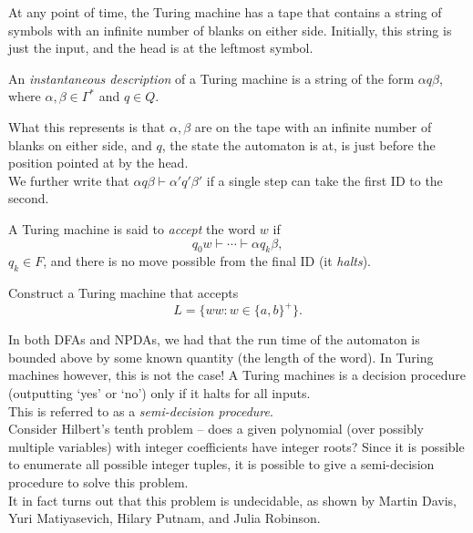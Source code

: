 	At any point of time, the Turing machine has a tape that contains a string of symbols with an infinite number of blanks on either side. Initially, this string is just the input, and the head is at the leftmost symbol.

	\begin{definition}
		An \emph{instantaneous description} of a Turing machine is a string of the form $\alpha q\beta$, where $\alpha,\beta \in \Gamma^*$ and $q \in Q$.
	\end{definition}
	What this represents is that $\alpha,\beta$ are on the tape with an infinite number of blanks on either side, and $q$, the state the automaton is at, is just before the position pointed at by the head.\\
	We further write that $\alpha q \beta \vdash \alpha' q' \beta'$ if a single step can take the first ID to the second.

	\begin{definition}
		A Turing machine is said to \emph{accept} the word $w$ if
		\[ q_0 w \vdash \cdots \vdash \alpha q_k\beta, \]
		$q_k \in F$, and there is no move possible from the final ID (it \emph{halts}).
	\end{definition}

	\begin{exercise}
		Construct a Turing machine that accepts
		\[ L = \{ ww : w \in \{a,b\}^+ \}. \]
	\end{exercise}

	In both DFAs and NPDAs, we had that the run time of the automaton is bounded above by some known quantity (the length of the word). In Turing machines however, this is not the case! A Turing machines is a decision procedure (outputting `yes' or `no') only if it halts for all inputs.\\
	This is referred to as a \emph{semi-decision procedure}.\\

	Consider Hilbert's tenth problem -- does a given polynomial (over possibly multiple variables) with integer coefficients have integer roots? Since it is possible to enumerate all possible integer tuples, it is possible to give a semi-decision procedure to solve this problem.\\
	It in fact turns out that this problem is undecidable, as shown by Martin Davis, Yuri Matiyasevich, Hilary Putnam, and Julia Robinson.\\


